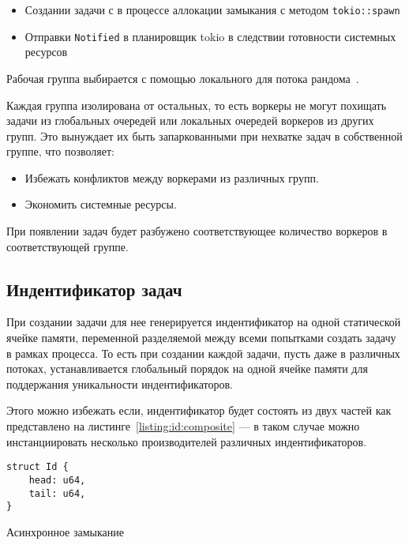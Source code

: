 \begin{itemize}
    \item Создании задачи с в процессе аллокации замыкания с методом \verb|tokio::spawn|
    \item Отправки \verb|Notified| в планировщик tokio в следствии готовности системных ресурсов
\end{itemize}

Рабочая группа выбирается с помощью локального для потока рандома~\cite{xorshiftRNG}.

Каждая группа изолирована от остальных, то есть воркеры не могут похищать задачи из глобальных очередей или локальных очередей воркеров из других групп. Это вынуждает их быть запаркованными при нехватке задач в собственной группе, что позволяет:

\begin{itemize}
    \item Избежать конфликтов между воркерами из различных групп.
    \item Экономить системные ресурсы.
\end{itemize}

При появлении задач будет разбужено соответствующее количество воркеров в соответствующей группе.

\subsection{Индентификатор задач}

При создании задачи для нее генерируется индентификатор на одной статической ячейке памяти, переменной разделяемой между всеми попытками создать задачу в рамках процесса. То есть при создании каждой задачи, пусть даже в различных потоках, устанавливается глобальный порядок на одной ячейке памяти для поддержания уникальности индентификаторов.

Этого можно избежать если, индентификатор будет состоять из двух частей как представлено на листинге~\ref{listing:id:composite} --- в таком случае можно инстанциировать несколько производителей различных индентификаторов.

\begin{listing}[H]
    \begin{verbatim}
struct Id {
    head: u64,
    tail: u64,
}
    \end{verbatim}

    \caption{Асинхронное замыкание}
    \label{listing:id:composite}
\end{listing}

